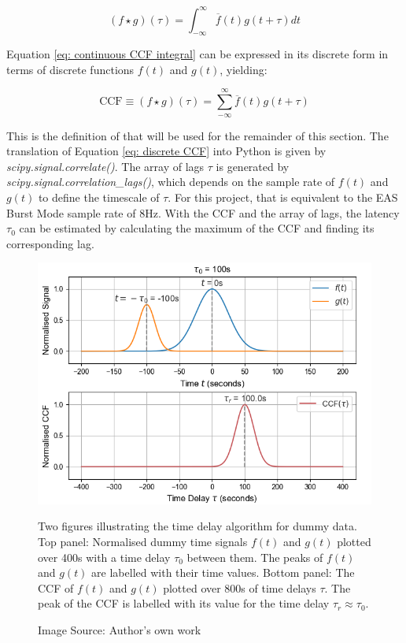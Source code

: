 \begin{equation} \label{eq: continuous CCF integral}
    (f\star g)(\tau)=\int_{-\infty}^{\infty}\overline{f}(t)g(t+\tau)dt
\end{equation}

Equation \ref{eq: continuous CCF integral} can be expressed in its discrete form in terms of discrete functions \(f(t)\) and \(g(t)\), yielding:

\begin{equation} \label{eq: discrete CCF}
    \textrm{CCF}\equiv(f\star g)(\tau)=\sum_{-\infty}^{\infty}\overline{f}(t)g(t+\tau)
\end{equation}

This is the definition of  that will be used for the remainder of this section\cite{2020SciPy}\cite{rabiner1978}. The translation of Equation \ref{eq: discrete CCF} into Python is given by \textit{scipy.signal.correlate()}. The array of lags \(\tau\) is generated by \textit{scipy.signal.correlation\_lags()}, which depends on the sample rate of \(f(t)\) and \(g(t)\) to define the timescale of \(\tau\). For this project, that is equivalent to the EAS Burst Mode sample rate of 8Hz. With the CCF and the array of lags, the latency \(\tau_0\) can be estimated by calculating the maximum of the CCF and finding its corresponding lag.
\\

\begin{figure}[h!]
    \centering
    \centerfloat
    \includegraphics[width=1\linewidth]{figures/Time Delay Tests - Clean.png}
    \caption{Two figures illustrating the time delay algorithm for dummy data. Top panel: Normalised dummy time signals \(f(t)\) and \(g(t)\) plotted over 400s with a time delay \(\tau_0\) between them. The peaks of \(f(t)\) and \(g(t)\) are labelled with their time values. Bottom panel: The CCF of \(f(t)\) and \(g(t)\) plotted over 800s of time delays \(\tau\). The peak of the CCF is labelled with its value for the time delay \(\tau_r\approx \tau_0\).}
    \caption*{Image Source: Author's own work}
    \label{fig: time delay tests - clean}
\end{figure}


